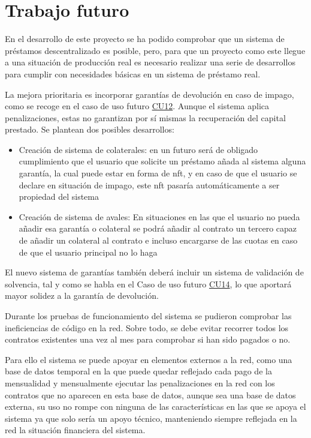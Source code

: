 \section{Trabajo futuro}

En el desarrollo de este proyecto se ha podido comprobar que un sistema de préstamos
descentralizado es posible, pero, para que un proyecto como este llegue a una situación
de producción real es necesario realizar una serie de desarrollos para cumplir con 
necesidades básicas en un sistema de préstamo real.

La mejora prioritaria es incorporar garantías de devolución en caso de impago,
como se recoge en el caso de uso futuro \hyperlink{cu:garantia}{CU12}.
Aunque el sistema aplica penalizaciones, estas no garantizan por sí mismas la
recuperación del capital prestado. Se plantean dos posibles desarrollos:

\begin{itemize}
     \item Creación de sistema de colaterales: en un futuro será de obligado 
     cumplimiento que el usuario que solicite un préstamo añada al sistema
     alguna garantía, la cual puede estar en forma de \gls{nft}, y en caso 
     de que el usuario se declare en situación de impago, este \gls{nft} pasaría 
     automáticamente a ser propiedad del sistema
     \item Creación de sistema de avales: En situaciones en las que el usuario
     no pueda añadir esa garantía o colateral se podrá añadir al contrato un tercero 
     capaz de añadir un colateral al contrato e incluso encargarse de las cuotas en 
     caso de que el usuario principal no lo haga
\end{itemize}

El nuevo sistema de garantías también deberá incluir un sistema de validación de
solvencia, tal y como se habla en el Caso de uso futuro \hyperlink{cu:solvencia}{CU14}, lo que aportará
mayor solidez a la garantía de devolución.

Durante los pruebas de funcionamiento del sistema se pudieron comprobar las ineficiencias
de código en la red. Sobre todo, se debe evitar recorrer todos los contratos existentes
una vez al mes para comprobar si han sido pagados o no. 

Para ello el sistema se puede 
apoyar en elementos externos a la red, como una base de datos temporal en la que 
puede 
quedar reflejado cada pago de la mensualidad y mensualmente ejecutar las 
penalizaciones en la red con los contratos que no aparecen en esta base de datos,
aunque sea una base de datos externa, su uso no rompe con ninguna de las características en las que se apoya el sistema ya que solo sería un apoyo técnico,
manteniendo siempre 
reflejada en la red la situación financiera del sistema.

